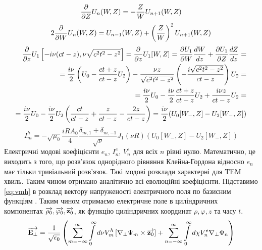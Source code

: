 %
\textcolor{blue} { \begin{equation*} 
\frac{\partial }{\partial Z} U_n (W,Z) = - \frac{Z}{W} U_{n+1} (W,Z)
\end{equation*} }
%
\textcolor{blue} { \begin{equation*}
2 \frac{\partial }{\partial W} U_n (W,Z) = U_{n-1} (W,Z) + 
\left( \frac{Z}{W} \right)^2 U_{n+1} (W,Z)
\end{equation*} }
%
\textcolor{blue} { \begin{equation*} \begin{aligned}
\frac{\partial }{\partial z} U_1 \left[ -i \nu (ct-z), \nu \sqrt{c^2t^2-z^2} \right] =
\frac{\partial }{\partial z} U_1[W,Z] = \frac{\partial U_1}{\partial W} \frac{d W}{d z} + 
\frac{\partial U_1}{\partial Z} \frac{d Z}{d z} = \\
= \frac{i \nu}{2} \left( U_0 - \frac{ct+z}{ct-z} U_2 \right) -
\frac{\nu z}{\sqrt{c^2t^2 - z^2}} 
\left( - \frac{i \sqrt{c^2t^2-z^2}}{ct-z} \right) U_2 = \\
= \frac{i \nu}{2} U_0 - \frac{i \nu}{2} \frac{ct+z}{ct-z} U_2 +
\frac{i \nu z}{ct-z} U_2 = \\ = \frac{i \nu}{2} U_0 - \frac{i \nu}{2} U_2
\left( \frac{ct}{ct-z} + \frac{z}{ct-z} - \frac{2z}{ct-z} \right) = 
\frac{i \nu}{2} (U_0[W_-,Z] - U_2[W_-,Z])
\end{aligned} \end{equation*} }
%
\begin{equation} \label{eq:imh}
I_{m}^{h} = - \sqrt{\mu_0} \frac{iR A_0}{4} 
\frac{\delta_{m,1} + \delta_{m,-1}}{\sqrt{\nu}} 
J_1 (\nu R) \left( U_0 [ W_-, Z ] - U_2 [ W_-, Z ] \right)
\end{equation}
%
Електричні модові коефіцієнти $ e_n $, $ I_n^e $, $ V_n^e $ для всіх $ n $
рівні нулю. Математично, це виходить з того, що розв'язок однорідного рівняння 
Клейна-Гордона відносно $ e_n $ має тільки тривіальний розв'язок. Такі модові
розклади характерні для TEM хвиль.
%
Таким чином отримано аналітично всі еволюційні коефіцієнти. Підставимо
\eqref{eq:vmh} в розклад вектору напруженості електричного поля по
базисним функціям \cite{imp:Dumin2010}. Таким чином отримаємо електричне 
поле в циліндричних компонентах $ \overrightarrow{\mathbf \rho_0}, \overrightarrow{\mathbf \varphi_0}, 
\overrightarrow{\mathbf z_0} $, як функцію циліндричних координат $ \rho, \varphi, z $ 
та часу $ t $.
%
\textcolor{blue} { \begin{equation*} \begin{aligned}
\overrightarrow{\mathbf E_\perp} = \frac{1}{\sqrt{\epsilon_0}} \left( 
\sum \limits_{m=-\infty}^{\infty} \int \limits_{0}^{\infty} 
d \nu V_m^h \left[  \nabla_\perp \Psi_m  \times  \overrightarrow{\mathbf z_0}  \right] +
\sum \limits_{n=-\infty}^{\infty} \int \limits_{0}^{\infty}
d \chi V_n^e \nabla_\perp \Phi_n \right)
\end{aligned} \end{equation*} }
